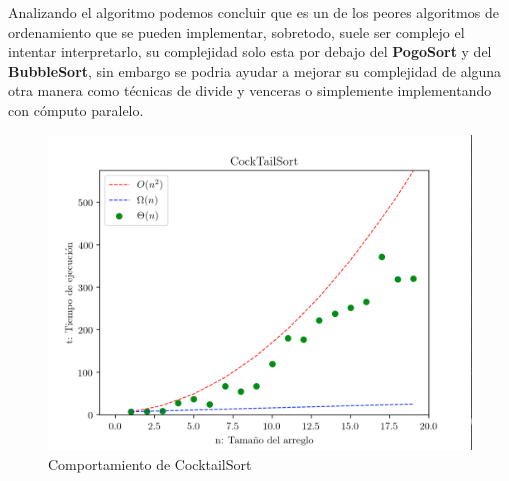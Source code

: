 \documentclass[12pt,twoside]{article}
\begin{document}
Analizando el algoritmo podemos concluir que es un de los peores algoritmos de ordenamiento que se pueden implementar, sobretodo, suele ser
complejo el intentar interpretarlo, su complejidad solo esta por debajo del \textbf{PogoSort} y del \textbf{BubbleSort}, sin embargo se
podria ayudar a mejorar su complejidad de alguna otra manera como técnicas de divide y venceras o simplemente implementando con cómputo paralelo.

\begin{figure}
  \centering
    \includegraphics[height=0.75\textwidth]{Figure4}
  \caption{Comportamiento de CocktailSort}
  \label{fig:ejemplo3}
\end{figure}
\end{document}
